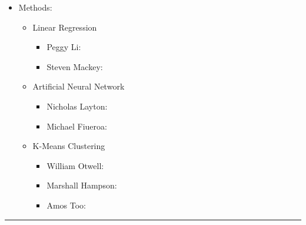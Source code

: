\documentclass[11pt]{article}
\newcommand{\horizontalLine}{
	\begin{center}
		\hrule width 1.0\textwidth
	\end{center}
}
\begin{document}
\begin{itemize}
    \item Methods:
    \begin{itemize}
        \item Linear Regression
        \begin{itemize}
            \item Peggy Li:
            \item Steven Mackey:
        \end{itemize}
        \item Artificial Neural Network
        \begin{itemize}
            \item Nicholas Layton:
            \item Michael Fiueroa:
        \end{itemize}
        \item K-Means Clustering
        \begin{itemize}
            \item William Otwell:
            \item Marshall Hampson:
            \item Amos Too:
        \end{itemize}
    \end{itemize}
\end{itemize}

\horizontalLine
\appendix
\end{document}
